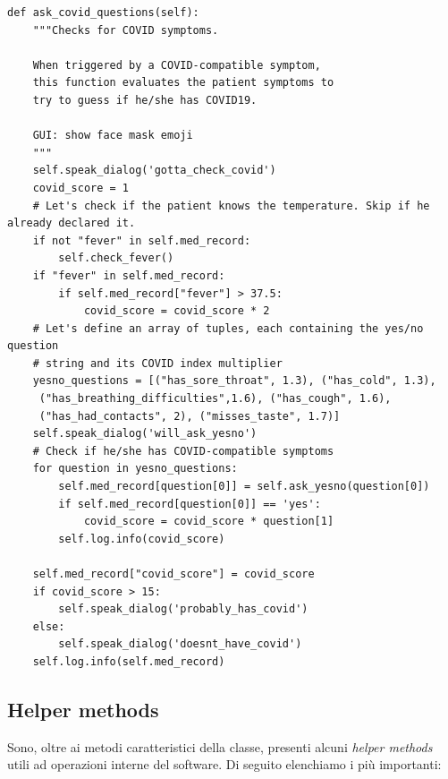 \begin{verbatim}
def ask_covid_questions(self):
    """Checks for COVID symptoms.

    When triggered by a COVID-compatible symptom, 
    this function evaluates the patient symptoms to 
    try to guess if he/she has COVID19.

    GUI: show face mask emoji
    """
    self.speak_dialog('gotta_check_covid')
    covid_score = 1
    # Let's check if the patient knows the temperature. Skip if he already declared it.
    if not "fever" in self.med_record:
        self.check_fever()
    if "fever" in self.med_record:
        if self.med_record["fever"] > 37.5:
            covid_score = covid_score * 2
    # Let's define an array of tuples, each containing the yes/no question
    # string and its COVID index multiplier
    yesno_questions = [("has_sore_throat", 1.3), ("has_cold", 1.3),
     ("has_breathing_difficulties",1.6), ("has_cough", 1.6),
     ("has_had_contacts", 2), ("misses_taste", 1.7)]
    self.speak_dialog('will_ask_yesno')
    # Check if he/she has COVID-compatible symptoms
    for question in yesno_questions:
        self.med_record[question[0]] = self.ask_yesno(question[0])
        if self.med_record[question[0]] == 'yes':
            covid_score = covid_score * question[1]
        self.log.info(covid_score)

    self.med_record["covid_score"] = covid_score
    if covid_score > 15:
        self.speak_dialog('probably_has_covid')
    else:
        self.speak_dialog('doesnt_have_covid')
    self.log.info(self.med_record)
\end{verbatim}
\subsection{Helper methods}
Sono, oltre ai metodi caratteristici della classe, presenti alcuni \textit{helper methods} utili ad operazioni interne del software. Di seguito elenchiamo i più importanti:
